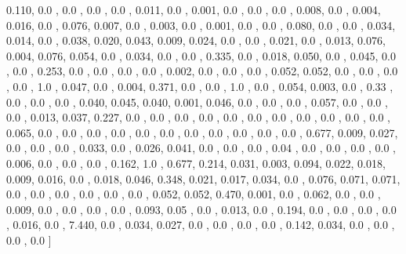 \documentclass[usenames,dvipsnames]{article} %
\begin{document}
0.110, 0.0  , 0.0  , 0.0  , 0.0  , 0.011, 0.0  , 0.001, 0.0  , 0.0  , 0.0  , 0.008, 0.0  , 0.004, 0.016, 0.0  , 0.076, 0.007, 0.0  , 0.003, 0.0  , 0.001, 0.0  , 0.0  , 0.080, 0.0  , 0.0  , 0.034, 0.014, 0.0  , 0.038, 0.020, 0.043, 0.009, 0.024, 0.0  , 0.0  , 0.021, 0.0  , 0.013, 0.076, 0.004, 0.076, 0.054, 0.0  , 0.034, 0.0  , 0.0  , 0.335, 0.0  , 0.018, 0.050, 0.0  , 0.045, 0.0  , 0.0  , 0.253, 0.0  , 0.0  , 0.0  , 0.0  , 0.002, 0.0  , 0.0  , 0.0  , 0.052, 0.052, 0.0  , 0.0  , 0.0  , 0.0  , 1.0  , 0.047, 0.0  , 0.004, 0.371, 0.0  , 0.0  , 1.0  , 0.0  , 0.054, 0.003, 0.0  , 0.33 , 0.0  , 0.0  , 0.0  , 0.040, 0.045, 0.040, 0.001, 0.046, 0.0  , 0.0  , 0.0  , 0.057, 0.0  , 0.0  , 0.0  , 0.013, 0.037, 0.227, 0.0  , 0.0  , 0.0  , 0.0  , 0.0  , 0.0  , 0.0  , 0.0  , 0.0  , 0.0  , 0.0  , 0.065, 0.0  , 0.0  , 0.0  , 0.0  , 0.0  , 0.0  , 0.0  , 0.0  , 0.0  , 0.0  , 0.0  , 0.677, 0.009, 0.027, 0.0  , 0.0  , 0.0  , 0.033, 0.0  , 0.026, 0.041, 0.0  , 0.0  , 0.0  , 0.04 , 0.0  , 0.0  , 0.0  , 0.0  , 0.006, 0.0  , 0.0  , 0.0  , 0.162, 1.0  , 0.677, 0.214, 0.031, 0.003, 0.094, 0.022, 0.018, 0.009, 0.016, 0.0  , 0.018, 0.046, 0.348, 0.021, 0.017, 0.034, 0.0  , 0.076, 0.071, 0.071, 0.0  , 0.0  , 0.0  , 0.0  , 0.0  , 0.0  , 0.052, 0.052, 0.470, 0.001, 0.0  , 0.062, 0.0  , 0.0  , 0.009, 0.0  , 0.0  , 0.0  , 0.0  , 0.093, 0.05 , 0.0  , 0.013, 0.0  , 0.194, 0.0  , 0.0  , 0.0  , 0.0  , 0.016, 0.0  , 7.440, 0.0  , 0.034, 0.027, 0.0  , 0.0  , 0.0  , 0.0  , 0.142, 0.034, 0.0  , 0.0  , 0.0  , 0.0  ]
\end{document}
